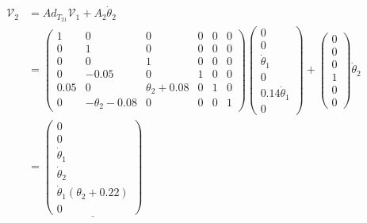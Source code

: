 \documentclass[]{scrreprt}
\newcommand{\myvec}[1]{\left(\begin{array}{c}#1\end{array}\right)}
\begin{document}
\begin{align*}
\mathcal{V}_2 &= Ad_{T_{21}}\mathcal{V}_1 + A_2\dot{\theta}_2\\
& = \left(\begin{array}{cccccc}
1 & 0 & 0 & 0 & 0 & 0 \\
0 & 1 & 0 & 0 & 0 & 0 \\
0 & 0 & 1 & 0 & 0 & 0 \\
0 & -0.05 & 0 & 1 & 0 & 0 \\
0.05 & 0 & \theta_2+0.08 & 0 & 1 & 0 \\
0 & -\theta_2-0.08 & 0 & 0 & 0 & 1
\end{array}\right)\left(\begin{array}{c}
0\\ 0\\ \dot{\theta}_1\\ 0\\ 0.14\dot{\theta}_1\\ 0
\end{array}\right)+
\left(\begin{array}{c}
0\\0\\0\\1\\0\\0
\end{array}\right)\dot{\theta}_2\\
& = \underline{\myvec{0 \\ 0 \\ \dot{\theta}_1\\ \dot{\theta}_2\\ \dot{\theta}_1(\theta_2+0.22)\\ 0}}
\end{align*}         
\end{document}
